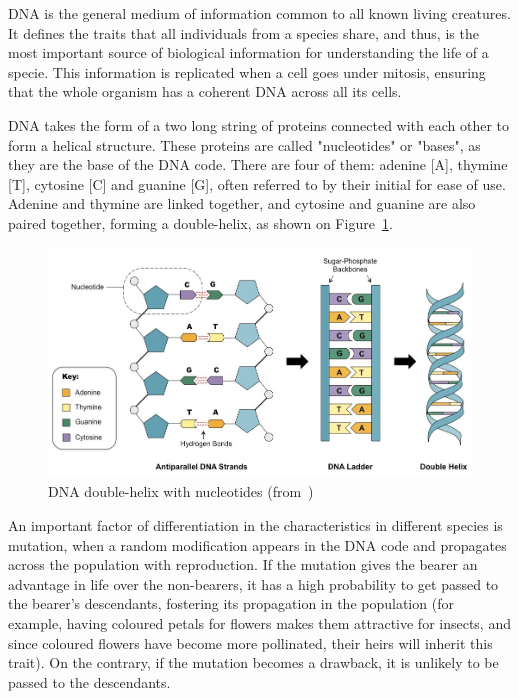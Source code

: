 
DNA is the general medium of information common to all known living creatures. It defines the traits that all individuals from a species share, and thus, is the most important source of biological information for understanding the life of a specie. This information is replicated when a cell goes under mitosis, ensuring that the whole organism has a coherent DNA across all its cells.

DNA takes the form of a two long string of proteins connected with each other to form a helical structure. These proteins are called "nucleotides" or "bases", as they are the base of the DNA code. There are four of them: adenine [A], thymine [T], cytosine [C] and guanine [G], often referred to by their initial for ease of use. Adenine and thymine are linked together, and cytosine and guanine are also paired together, forming a double-helix, as shown on Figure~\ref{fig:double-stranded-dnamed}.

\begin{figure}[h]
	\centering
	\includegraphics[width=1\linewidth]{double-stranded-dna_med}
	\caption{DNA double-helix with nucleotides (from~\cite{cornell:dnastructure})}
	\label{fig:double-stranded-dnamed}
\end{figure}


An important factor of differentiation in the characteristics in different species is mutation, when a random modification appears in the DNA code and propagates across the population with reproduction. If the mutation gives the bearer an advantage in life over the non-bearers, it has a high probability to get passed to the bearer's descendants, fostering its propagation in the population (for example, having coloured petals for flowers makes them attractive for insects, and since coloured flowers have become more pollinated, their heirs will inherit this trait). On the contrary, if the mutation becomes a drawback, it is unlikely to be passed to the descendants.

